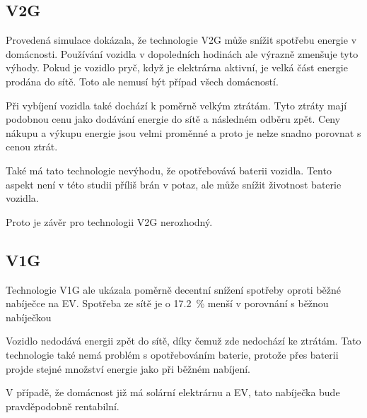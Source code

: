 \documentclass[12pt,a4paper]{article}
\begin{document}
\subsection{V2G}

Provedená simulace dokázala, že technologie V2G může snížit spotřebu energie v domácnosti.
Používání vozidla v dopoledních hodinách ale výrazně zmenšuje tyto výhody.
Pokud je vozidlo pryč, když je elektrárna aktivní, je velká část energie prodána do sítě.
Toto ale nemusí být případ všech domácností.

Při vybíjení vozidla také dochází k poměrně velkým ztrátám.
Tyto ztráty mají podobnou cenu jako dodávání energie do sítě a následném odběru zpět.
Ceny nákupu a výkupu energie jsou velmi proměnné a proto je nelze snadno porovnat s cenou ztrát.

Také má tato technologie nevýhodu, že opotřebovává baterii vozidla.
Tento aspekt není v této studii příliš brán v potaz, ale může snížit životnost baterie vozidla.

Proto je závěr pro technologii V2G nerozhodný.

\subsection{V1G}

Technologie V1G ale ukázala poměrně decentní snížení spotřeby oproti běžné nabíječce na EV.
Spotřeba ze sítě je o 17.2~\% menší v porovnání s běžnou nabíječkou

Vozidlo nedodává energii zpět do sítě, díky čemuž zde nedochází ke ztrátám.
Tato technologie také nemá problém s opotřebováním baterie,
protože přes baterii projde stejné množství energie jako při běžném nabíjení.

V případě, že domácnost již má solární elektrárnu a EV,
tato nabíječka bude pravděpodobně rentabilní.

\newpage

\printbibliography
\end{document}
